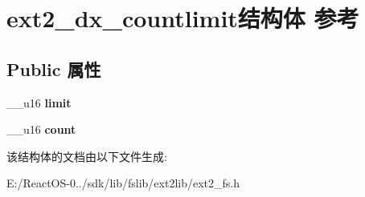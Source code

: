 \hypertarget{structext2__dx__countlimit}{}\section{ext2\+\_\+dx\+\_\+countlimit结构体 参考}
\label{structext2__dx__countlimit}
\subsection*{Public 属性}
\begin{DoxyCompactItemize}
\item 
\mbox{\label{structext2__dx__countlimit_ae83eae7d74f644ceac09f343bd833f1e}} 
\+\_\+\+\_\+u16 {\bfseries limit}
\item 
\mbox{\label{structext2__dx__countlimit_a1a42ca64ee8a5933ad203ae35dbb29e1}} 
\+\_\+\+\_\+u16 {\bfseries count}
\end{DoxyCompactItemize}


该结构体的文档由以下文件生成\+:\begin{DoxyCompactItemize}
\item 
E\+:/\+React\+O\+S-\/0../sdk/lib/fslib/ext2lib/ext2\+\_\+fs.\+h\end{DoxyCompactItemize}
